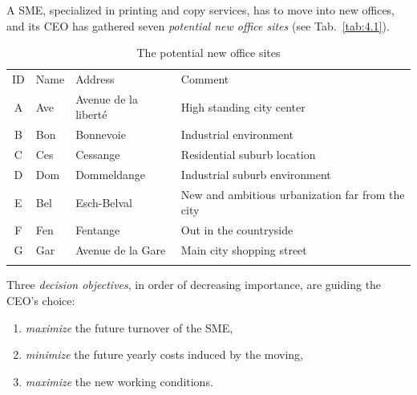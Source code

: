 A SME, specialized in printing and copy services, has to move into new offices, and its CEO has gathered seven \emph{potential new office sites} (see Tab.~\vref{tab:4.1}).
\begin{table}[ht]
\caption{The potential new office sites}
\label{tab:4.1}       %
\begin{center}
    \begin{tabular}{c|l|l|l}
      \svhline\noalign{\smallskip}
      ID & Name & Address & Comment\\
      \noalign{\smallskip}\hline\noalign{\smallskip}
    A &   Ave  &  Avenue de la liberté &  High standing city center\\
    B &   Bon  &  Bonnevoie &             Industrial environment\\
    C &   Ces  &  Cessange &              Residential suburb location\\
    D &   Dom  &  Dommeldange &           Industrial suburb environment\\
    E &   Bel  &  Esch-Belval &           New and ambitious urbanization far from the city\\
    F &   Fen  &  Fentange &              Out in the countryside\\
      G &   Gar  &  Avenue de la Gare &     Main city shopping street\\
      \noalign{\smallskip}\hline
    \end{tabular}
\end{center}
\end{table}

Three \emph{decision objectives}, in order of decreasing importance, are guiding the CEO's choice:
\begin{enumerate}[leftmargin=1cm]
\item \emph{maximize} the future turnover of the SME,
\item \emph{minimize} the future yearly costs induced by the moving,
\item \emph{maximize} the new working conditions.
\end{enumerate}

